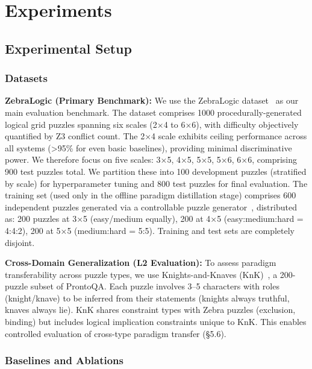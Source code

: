 
\section{Experiments}

\subsection{Experimental Setup}

\subsubsection{Datasets}

\textbf{ZebraLogic (Primary Benchmark):} We use the ZebraLogic dataset~\citep{lin2025zebralogic} as our main evaluation benchmark. The dataset comprises 1000 procedurally-generated logical grid puzzles spanning six scales (2×4 to 6×6), with difficulty objectively quantified by Z3 conflict count. The 2×4 scale exhibits ceiling performance across all systems (>95\% for even basic baselines), providing minimal discriminative power. We therefore focus on five scales: 3×5, 4×5, 5×5, 5×6, 6×6, comprising 900 test puzzles total. We partition these into 100 development puzzles (stratified by scale) for hyperparameter tuning and 800 test puzzles for final evaluation. The training set (used only in the offline paradigm distillation stage) comprises 600 independent puzzles generated via a controllable puzzle generator~\citep{prior2025}, distributed as: 200 puzzles at 3×5 (easy/medium equally), 200 at 4×5 (easy:medium:hard = 4:4:2), 200 at 5×5 (medium:hard = 5:5). Training and test sets are completely disjoint.

\textbf{Cross-Domain Generalization (L2 Evaluation):} To assess paradigm transferability across puzzle types, we use Knights-and-Knaves (KnK)~\citep{saparov2022pronto}, a 200-puzzle subset of ProntoQA. Each puzzle involves 3--5 characters with roles (knight/knave) to be inferred from their statements (knights always truthful, knaves always lie). KnK shares constraint types with Zebra puzzles (exclusion, binding) but includes logical implication constraints unique to KnK. This enables controlled evaluation of cross-type paradigm transfer (§5.6).

\subsubsection{Baselines and Ablations}

